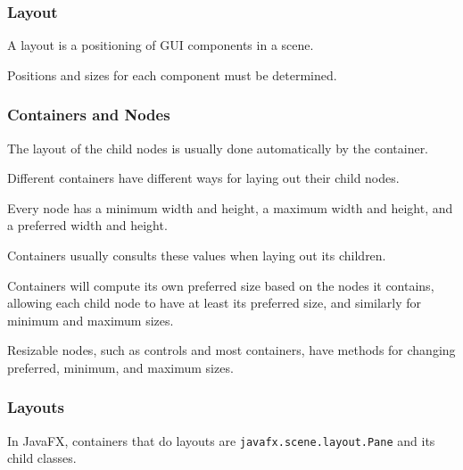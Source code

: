 \documentclass{beamer}
\newcommand{\mil}[1]{\texttt{#1}}
\begin{document}
\begin{frame}

    \frametitle{Layout}
    
    A layout is a positioning of GUI components in a scene.  
    
    \bigskip
    
    Positions and sizes for each component must be determined.
\end{frame}



\begin{frame}

    \frametitle{Containers and Nodes}
    
    The layout of the child nodes is usually done automatically by the container.
    
    \bigskip
    
    Different containers have different ways for laying out their child nodes.
    
    \bigskip
    
    Every node has a minimum width and height, a maximum width and height, and a preferred width and height.
    
    \bigskip
    
    Containers usually consults these values when laying out its children.
    
    \bigskip
    
    Containers will compute its own preferred size based on the nodes it contains, allowing each child node to have at least its preferred size, and similarly for minimum and maximum sizes.
    
    \bigskip
    
    Resizable nodes, such as controls and most containers, have methods for changing preferred, minimum, and maximum sizes.
\end{frame}

\begin{frame}
    
    \frametitle{Layouts}
    
    In JavaFX, containers that do layouts are \mil{javafx.scene.layout.Pane} and its child classes.
    
\end{frame}
\end{document}
